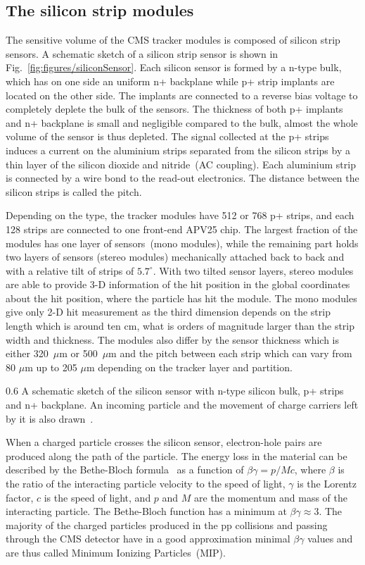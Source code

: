 \subsection{The silicon strip modules}

The sensitive volume of the CMS tracker modules is composed of silicon strip sensors. A schematic sketch of a silicon strip sensor is shown in Fig.~\ref{fig:figures/siliconSensor}. Each silicon sensor is formed by a n-type bulk, which has on one side an uniform n+ backplane while p+ strip implants are located on the other side. The implants are connected to a reverse bias voltage to completely deplete the bulk of the sensors. The thickness of both p+ implants and n+ backplane is small and negligible compared to the bulk, almost the whole volume of the sensor is thus depleted. The signal collected at the p+ strips induces a current on the aluminium strips separated from the silicon strips by a thin layer of the silicon dioxide and nitride~(AC coupling). Each aluminium strip is connected by a wire bond to the read-out electronics. The distance between the silicon strips is called the pitch.

Depending on the type, the tracker modules have 512 or 768 p+ strips, and each 128 strips are connected to one front-end APV25 chip. The largest fraction of the modules has one layer of sensors~(mono modules), while the remaining part holds two layers of sensors (stereo modules) mechanically attached back to back and with a relative tilt of strips of $5.7^{\circ}$. With two tilted sensor layers, stereo modules are able to provide 3-D information of the hit position in the global coordinates about the hit position, where the particle has hit the module. The mono modules give only 2-D hit measurement as the third dimension depends on the strip length which is around ten cm, what is orders of magnitude larger than the strip width and thickness. The modules also differ by the sensor thickness which is either 320~$\mu$m or 500~$\mu$m and the pitch between each strip which can vary from 80 $\mu$m up to 205 $\mu$m depending on the tracker layer and partition.

                 {0.6}       %
                 {A schematic sketch of the silicon sensor with n-type silicon bulk, p+ strips and n+ backplane. An incoming particle and the movement of charge carriers left by it is also drawn~\cite{website:sensor}. } %

When a charged particle crosses the silicon sensor, electron-hole pairs are produced along the path of the particle. The energy loss in the material can be described by the Bethe-Bloch formula~\cite{Groom:2000sm} as a function of $\beta\gamma = p/Mc$, where $\beta$ is the ratio of the interacting particle velocity to the speed of light, $\gamma$ is the Lorentz factor, $c$ is the speed of light, and $p$ and $M$ are the momentum and mass of the interacting particle. The Bethe-Bloch function has a minimum at $\beta\gamma \approx 3$. The majority of the charged particles produced in the pp collisions and passing through the CMS detector have in a good approximation minimal $\beta\gamma$ values and are thus called Minimum Ionizing Particles~(MIP).

